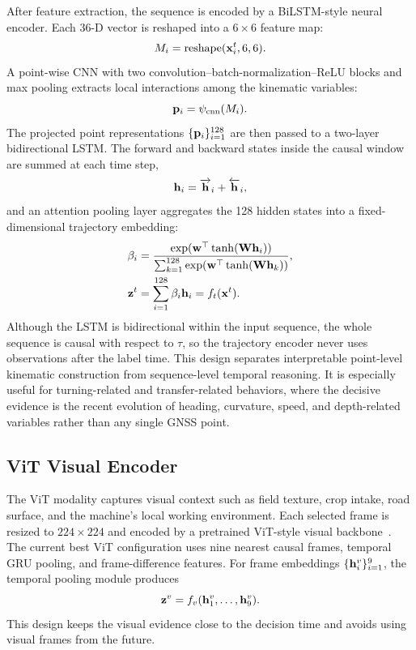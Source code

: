 After feature extraction, the sequence is encoded by a BiLSTM-style neural encoder. Each 36-D vector is reshaped into a $6\times6$ feature map:
\begin{equation}
    M_i=\operatorname{reshape}(\mathbf{x}_i^t,6,6).
\end{equation}
A point-wise CNN with two convolution--batch-normalization--ReLU blocks and max pooling extracts local interactions among the kinematic variables:
\begin{equation}
    \mathbf{p}_i = \psi_{\mathrm{cnn}}(M_i).
\end{equation}
The projected point representations $\{\mathbf{p}_i\}_{i=1}^{128}$ are then passed to a two-layer bidirectional LSTM. The forward and backward states inside the causal window are summed at each time step,
\begin{equation}
    \mathbf{h}_i = \overrightarrow{\mathbf{h}}_i + \overleftarrow{\mathbf{h}}_i,
\end{equation}
and an attention pooling layer aggregates the 128 hidden states into a fixed-dimensional trajectory embedding:
\begin{align}
    \beta_i &= \frac{\exp(\mathbf{w}^{\top}\tanh(\mathbf{W}\mathbf{h}_i))}
    {\sum_{k=1}^{128}\exp(\mathbf{w}^{\top}\tanh(\mathbf{W}\mathbf{h}_k))}, \\
    \mathbf{z}^{t} &= \sum_{i=1}^{128}\beta_i \mathbf{h}_i = f_t(\mathbf{x}^{t}).
\end{align}
Although the LSTM is bidirectional within the input sequence, the whole sequence is causal with respect to $\tau$, so the trajectory encoder never uses observations after the label time. This design separates interpretable point-level kinematic construction from sequence-level temporal reasoning. It is especially useful for turning-related and transfer-related behaviors, where the decisive evidence is the recent evolution of heading, curvature, speed, and depth-related variables rather than any single GNSS point.

\subsection{ViT Visual Encoder}

The ViT modality captures visual context such as field texture, crop intake, road surface, and the machine's local working environment. Each selected frame is resized to $224 \times 224$ and encoded by a pretrained ViT-style visual backbone~\cite{dosovitskiy2021vit}. The current best ViT configuration uses nine nearest causal frames, temporal GRU pooling, and frame-difference features. For frame embeddings $\{\mathbf{h}_i^{v}\}_{i=1}^{9}$, the temporal pooling module produces
\begin{equation}
    \mathbf{z}^{v} = f_v(\mathbf{h}_1^{v}, \ldots, \mathbf{h}_9^{v}).
\end{equation}
This design keeps the visual evidence close to the decision time and avoids using visual frames from the future.

